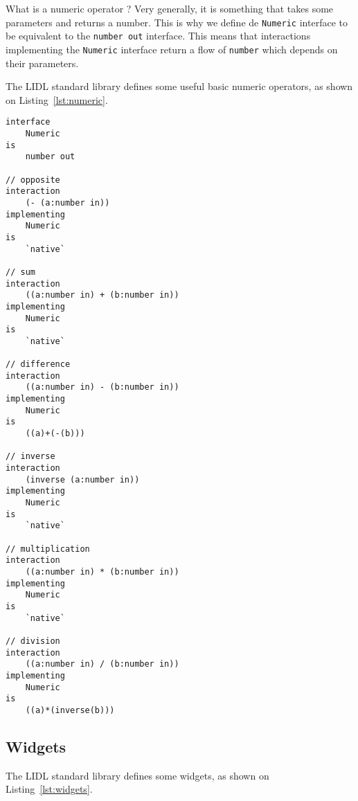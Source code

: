 What is a numeric operator ? Very generally, it is something that takes some parameters and returns a number. This is why we define de \lstinline{Numeric} interface to be equivalent to the \lstinline{number out} interface. This means that interactions implementing the \lstinline{Numeric} interface return a flow of \lstinline{number} which depends on their parameters.

The LIDL standard library defines some useful basic numeric operators, as shown on Listing~\ref{lst:numeric}.

\begin{lstlisting}[caption=The Number expressions definitions of the standard LIDL library,label={lst:numeric}]
interface 
	Numeric 
is
	number out

// opposite
interaction 
	(- (a:number in))
implementing 
	Numeric
is
	`native`

// sum
interaction 
	((a:number in) + (b:number in))
implementing 
	Numeric
is
	`native`
	
// difference
interaction 
	((a:number in) - (b:number in))
implementing 
	Numeric
is
	((a)+(-(b)))

// inverse
interaction
	(inverse (a:number in))
implementing
	Numeric
is
	`native`

// multiplication
interaction 
	((a:number in) * (b:number in))
implementing 
	Numeric
is
	`native`

// division
interaction 
	((a:number in) / (b:number in))
implementing 
	Numeric
is
	((a)*(inverse(b)))
\end{lstlisting}





\subsection{Widgets}

The LIDL standard library defines some widgets, as shown on Listing~\ref{lst:widgets}.

